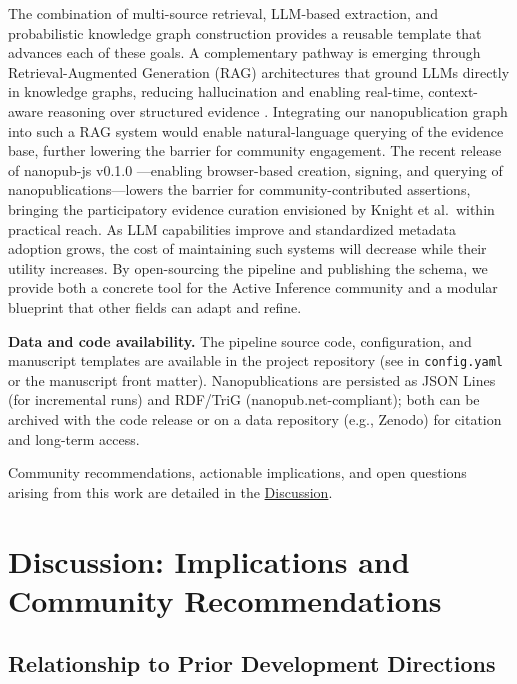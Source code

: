 \documentclass[
  english,
]{article}
\begin{document}
{{{{{{{{{{{{{{{{The combination of multi-source retrieval, LLM-based extraction, and
probabilistic knowledge graph construction provides a reusable template
that advances each of these goals. A complementary pathway is emerging
through Retrieval-Augmented Generation (RAG) architectures that ground
LLMs directly in knowledge graphs, reducing hallucination and enabling
real-time, context-aware reasoning over structured evidence
\citep{fan2024survey}. Integrating our nanopublication graph into such a
RAG system would enable natural-language querying of the evidence base,
further lowering the barrier for community engagement. The recent
release of nanopub-js v0.1.0 \citep{kuhn2026nanopubjs}---enabling
browser-based creation, signing, and querying of
nanopublications---lowers the barrier for community-contributed
assertions, bringing the participatory evidence curation envisioned by
Knight et al.~within practical reach. As LLM capabilities improve and
standardized metadata adoption grows, the cost of maintaining such
systems will decrease while their utility increases. By open-sourcing
the pipeline and publishing the schema, we provide both a concrete tool
for the Active Inference community and a modular blueprint that other
fields can adapt and refine.

\textbf{Data and code availability.} The pipeline source code,
configuration, and manuscript templates are available in the project
repository (see  in \texttt{config.yaml} or
the manuscript front matter). Nanopublications are persisted as JSON
Lines (for incremental runs) and RDF/TriG (nanopub.net-compliant); both
can be archived with the code release or on a data repository (e.g.,
Zenodo) for citation and long-term access.

Community recommendations, actionable implications, and open questions
arising from this work are detailed in the
\hyperref[sec:discussion]{Discussion}.

\newpage

\section{\texorpdfstring{Discussion: Implications and Community
Recommendations
\label{sec:discussion}}{Discussion: Implications and Community Recommendations}}\label{discussion-implications-and-community-recommendations}

\subsection{Relationship to Prior Development
Directions}\label{relationship-to-prior-development-directions}

}}}}}}}}}}}}}}}}
\end{document}
